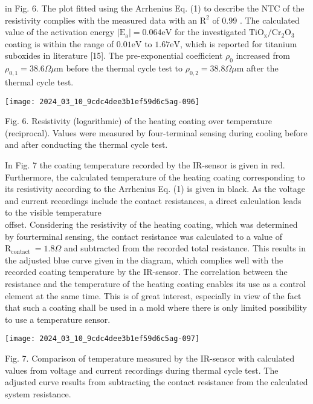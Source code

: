\documentclass[10pt]{article}
\begin{document}
in Fig. 6. The plot fitted using the Arrhenius Eq. (1) to describe the NTC of the resistivity complies with the measured data with an $\mathrm{R}^{2}$ of 0.99 . The calculated value of the activation energy $\left|\mathrm{E}_{\mathrm{a}}\right|=0.064 \mathrm{eV}$ for the investigated $\mathrm{TiO}_{\mathrm{x}} / \mathrm{Cr}_{2} \mathrm{O}_{3}$ coating is within the range of $0.01 \mathrm{eV}$ to $1.67 \mathrm{eV}$, which is reported for titanium suboxides in literature [15]. The pre-exponential coefficient $\rho_{0}$ increased from $\rho_{0,1}=38.6 \Omega \mu \mathrm{m}$ before the thermal cycle test to $\rho_{0,2}=38.8 \Omega \mu \mathrm{m}$ after the thermal cycle test.

\begin{center}
\texttt{[image: 2024\_03\_10\_9cdc4dee3b1ef59d6c5ag-096]}
\end{center}

Fig. 6. Resistivity (logarithmic) of the heating coating over temperature (reciprocal). Values were measured by four-terminal sensing during cooling before and after conducting the thermal cycle test.

In Fig. 7 the coating temperature recorded by the IR-sensor is given in red. Furthermore, the calculated temperature of the heating coating corresponding to its resistivity according to the Arrhenius Eq. (1) is given in black. As the voltage and current recordings include the contact resistances, a direct calculation leads to the visible temperature\\
offset. Considering the resistivity of the heating coating, which was determined by fourterminal sensing, the contact resistance was calculated to a value of $\mathrm{R}_{\text {contact }}=1.8 \Omega$ and subtracted from the recorded total resistance. This results in the adjusted blue curve given in the diagram, which complies well with the recorded coating temperature by the IR-sensor. The correlation between the resistance and the temperature of the heating coating enables its use as a control element at the same time. This is of great interest, especially in view of the fact that such a coating shall be used in a mold where there is only limited possibility to use a temperature sensor.

\begin{center}
\texttt{[image: 2024\_03\_10\_9cdc4dee3b1ef59d6c5ag-097]}
\end{center}

Fig. 7. Comparison of temperature measured by the IR-sensor with calculated values from voltage and current recordings during thermal cycle test. The adjusted curve results from subtracting the contact resistance from the calculated system resistance.
\end{document}
